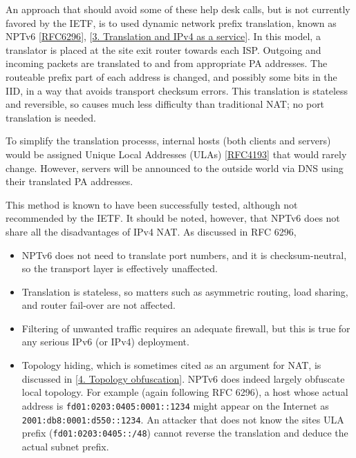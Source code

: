 \documentclass[
]{article}
\begin{document}
An approach that should avoid some of these help desk calls, but is not
currently favored by the IETF, is to used dynamic network prefix
translation, known as NPTv6
{[}\href{https://www.rfc-editor.org/info/rfc6296}{RFC6296}{]},
{[}\hyperref[translation-and-ipv4-as-a-service]{3. Translation and IPv4
as a service}{]}. In this model, a translator is placed at the site exit
router towards each ISP. Outgoing and incoming packets are translated to
and from appropriate PA addresses. The routeable prefix part of each
address is changed, and possibly some bits in the IID, in a way that
avoids transport checksum errors. This translation is stateless and
reversible, so causes much less difficulty than traditional NAT; no port
translation is needed.

To simplify the translation processs, internal hosts (both clients and
servers) would be assigned Unique Local Addresses (ULAs)
{[}\href{https://www.rfc-editor.org/info/rfc4193}{RFC4193}{]} that would
rarely change. However, servers will be announced to the outside world
via DNS using their translated PA addresses.

This method is known to have been successfully tested, although not
recommended by the IETF. It should be noted, however, that NPTv6 does
not share all the disadvantages of IPv4 NAT. As discussed in RFC 6296,

\begin{itemize}
\item
  NPTv6 does not need to translate port numbers, and it is
  checksum-neutral, so the transport layer is effectively unaffected.
\item
  Translation is stateless, so matters such as asymmetric routing, load
  sharing, and router fail-over are not affected.
\item
  Filtering of unwanted traffic requires an adequate firewall, but this
  is true for any serious IPv6 (or IPv4) deployment.
\item
  Topology hiding, which is sometimes cited as an argument for NAT, is
  discussed in {[}\hyperref[topology-obfuscation]{4. Topology
  obfuscation}{]}. NPTv6 does indeed largely obfuscate local topology.
  For example (again following RFC 6296), a host whose actual address is
  \texttt{fd01:0203:0405:0001::1234} might appear on the Internet as
  \texttt{2001:db8:0001:d550::1234}. An attacker that does not know the
  site\textquotesingle s ULA prefix (\texttt{fd01:0203:0405::/48})
  cannot reverse the translation and deduce the actual subnet prefix.
\end{itemize}
\end{document}
